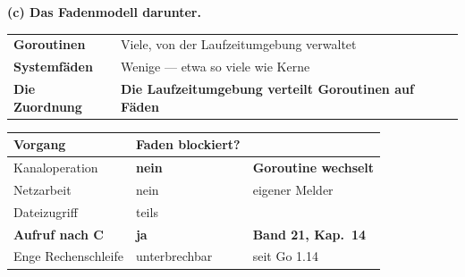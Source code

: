 \begin{aufgabe}
\begin{center}
\end{center}

\medskip
\textbf{(c) Das Fadenmodell darunter.}

\begin{center}
\renewcommand{\arraystretch}{1.5}
\begin{tabular}{@{}P{2.6cm}P{6.2cm}@{}}
\toprule
\textbf{Goroutinen} & Viele, von der Laufzeitumgebung verwaltet\\
\textbf{Systemfäden} & Wenige --- etwa so viele wie Kerne\\
\textbf{Die Zuordnung} & \textbf{Die Laufzeitumgebung verteilt Goroutinen auf Fäden}\\
\bottomrule
\end{tabular}
\end{center}

\begin{center}
\renewcommand{\arraystretch}{1.45}
\begin{tabular}{@{}P{3.4cm}P{2.2cm}P{2.6cm}@{}}
\toprule
\textbf{Vorgang} & \textbf{Faden blockiert?} & \\
\midrule
Kanaloperation & \textcolor{gruen}{\textbf{nein}} & \textbf{Goroutine wechselt}\\
Netzarbeit & \textcolor{gruen}{nein} & \textcolor{gruen}{eigener Melder}\\
Dateizugriff & \textcolor{mittel}{teils} & \\
\textbf{Aufruf nach C} & \textcolor{akzent}{\textbf{ja}} & \textcolor{akzent}{\textbf{Band 21, Kap.~14}}\\
Enge Rechenschleife & \textcolor{mittel}{unter\-brechbar} & seit Go 1.14\\
\bottomrule
\end{tabular}
\end{center}

\begin{center}
\begin{minipage}{0.88\textwidth}
\end{minipage}
\end{center}


\end{aufgabe}
